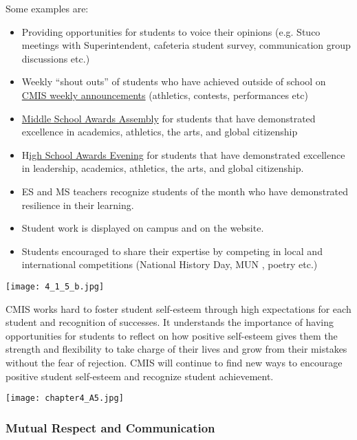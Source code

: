 \begin{findings}
Some examples are:
\begin{itemize}
\item Providing opportunities for students to voice their opinions (e.g. Stuco meetings with Superintendent, cafeteria student survey, communication group discussions etc.)
\item Weekly “shout outs” of students who have achieved outside of school on \href{http://blogs.cmis.ac.th/eagles/friday-september-16-2016/}{CMIS weekly announcements} (athletics, contests, performances etc)
\item\href{https://docs.google.com/a/cmis.ac.th/document/d/1DgY3NXB6m6qvmWnaRr2B2jswCGHRjaPFNPJA2Xzk1qw/edit?usp=sharing}{ Middle School Awards Assembly} for students that have demonstrated excellence in academics, athletics, the arts, and global citizenship
\item H\href{https://docs.google.com/document/d/1pxioSUeOgKZ4dT1jA9DiVzDjZjtrxuM-Gjqh7fRy0Us/edit?usp=sharing}{igh School Awards Evening} for students that have demonstrated excellence in leadership, academics, athletics, the arts, and global  citizenship.
\item ES and MS teachers recognize students of the month who have demonstrated resilience in their learning.
\item Student work is displayed on campus and on the website. 
\item Students encouraged to share their expertise by competing in local and international competitions (National History Day, MUN , poetry  etc.)
\end{itemize}

\texttt{[image: 4\_1\_5\_b.jpg]}


CMIS works hard to foster student self-esteem through high expectations for each student and recognition of successes. It understands the importance of having opportunities for students to reflect on how positive self-esteem gives them the strength and flexibility to take charge of their lives and grow from their mistakes without the fear of rejection. CMIS will continue to find new ways to encourage positive student self-esteem and recognize student achievement. 
\end{findings}

{\centering\texttt{[image: chapter4\_A5.jpg]}}

\subsubsection{Mutual Respect and Communication}

